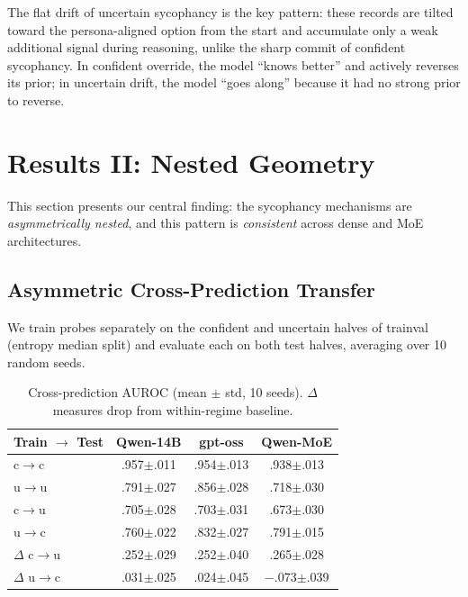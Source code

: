 \documentclass[11pt]{article}
\begin{document}
The flat drift of uncertain sycophancy is the key pattern: these records are tilted toward the persona-aligned option from the start and accumulate only a weak additional signal during reasoning, unlike the sharp commit of confident sycophancy.
In confident override, the model ``knows better'' and actively reverses its prior; in uncertain drift, the model ``goes along'' because it had no strong prior to reverse.


\section{Results II: Nested Geometry}
\label{sec:results2}

This section presents our central finding: the sycophancy mechanisms are \emph{asymmetrically nested}, and this pattern is \emph{consistent} across dense and MoE architectures.

\subsection{Asymmetric Cross-Prediction Transfer}

We train probes separately on the confident and uncertain halves of trainval (entropy median split) and evaluate each on both test halves, averaging over 10 random seeds.

\begin{table}[t]
\caption{Cross-prediction AUROC (mean $\pm$ std, 10 seeds). $\Delta$ measures drop from within-regime baseline.}
\label{tab:cross}
\begin{center}
\begin{small}
\begin{sc}
\setlength{\tabcolsep}{4pt}
\begin{tabular}{lccc}
\toprule
Train $\to$ Test & Qwen-14B & gpt-oss & Qwen-MoE \\
\midrule
c$\to$c & .957{\tiny$\pm$.011} & .954{\tiny$\pm$.013} & .938{\tiny$\pm$.013} \\
u$\to$u & .791{\tiny$\pm$.027} & .856{\tiny$\pm$.028} & .718{\tiny$\pm$.030} \\
c$\to$u & .705{\tiny$\pm$.028} & .703{\tiny$\pm$.031} & .673{\tiny$\pm$.030} \\
u$\to$c & .760{\tiny$\pm$.022} & .832{\tiny$\pm$.027} & .791{\tiny$\pm$.015} \\
\midrule
$\Delta$ c$\to$u & .252{\tiny$\pm$.029} & .252{\tiny$\pm$.040} & .265{\tiny$\pm$.028} \\
$\Delta$ u$\to$c & .031{\tiny$\pm$.025} & .024{\tiny$\pm$.045} & $-$.073{\tiny$\pm$.039} \\
\bottomrule
\end{tabular}
\end{sc}
\end{small}
\end{center}
\end{table}
\end{document}
